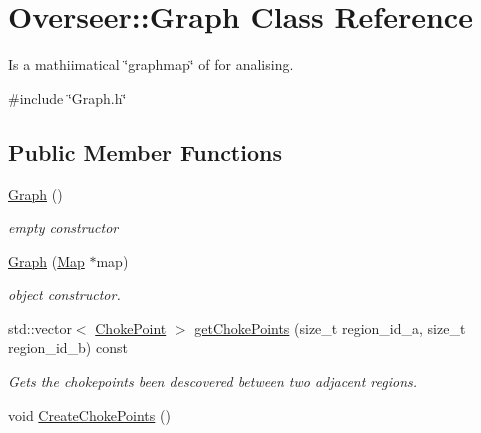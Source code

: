 \hypertarget{classOverseer_1_1Graph}{}\section{Overseer\+:\+:Graph Class Reference}
\label{classOverseer_1_1Graph}


Is a mathiimatical \char`\"{}graphmap\char`\"{} of for analising.  




{\ttfamily \#include \char`\"{}Graph.\+h\char`\"{}}

\subsection*{Public Member Functions}
\begin{DoxyCompactItemize}
\item 
\hyperlink{classOverseer_1_1Graph_a8d8f7394a8403b305682d19e72fe2678}{Graph} ()\hypertarget{classOverseer_1_1Graph_a8d8f7394a8403b305682d19e72fe2678}{}\label{classOverseer_1_1Graph_a8d8f7394a8403b305682d19e72fe2678}

\begin{DoxyCompactList}\small\item\em empty constructor \end{DoxyCompactList}\item 
\hyperlink{classOverseer_1_1Graph_af9efde8054cddf829f36a66ff8df5e8b}{Graph} (\hyperlink{classOverseer_1_1Map}{Map} $\ast$map)
\begin{DoxyCompactList}\small\item\em object constructor. \end{DoxyCompactList}\item 
std\+::vector$<$ \hyperlink{classOverseer_1_1ChokePoint}{Choke\+Point} $>$ \hyperlink{classOverseer_1_1Graph_ae4032b7e8b2c2e936664eef011a8273a}{get\+Choke\+Points} (size\+\_\+t region\+\_\+id\+\_\+a, size\+\_\+t region\+\_\+id\+\_\+b) const 
\begin{DoxyCompactList}\small\item\em Gets the chokepoints been descovered between two adjacent regions. \end{DoxyCompactList}\item 
void \hyperlink{classOverseer_1_1Graph_abc6459d9a554bdbfbe7fdfb87b3177cd}{Create\+Choke\+Points} ()\hypertarget{classOverseer_1_1Graph_abc6459d9a554bdbfbe7fdfb87b3177cd}{}\label{classOverseer_1_1Graph_abc6459d9a554bdbfbe7fdfb87b3177cd}


\end{DoxyCompactItemize}
